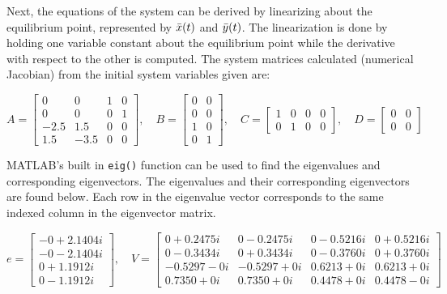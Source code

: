 \documentclass[../notes.tex]{subfiles}
\begin{document}
Next, the equations of the system can be derived by linearizing about the equilibrium point, represented by $\Bar{x}(t)$ and $\Bar{y}(t)$. The linearization is done by holding one variable constant about the equilibrium point while the derivative with respect to the other is computed. The system matrices calculated (numerical Jacobian) from the initial system variables given are:

\begin{equation*} 
  A =
  \begin{bmatrix}
    0 &0 &1 &0\\ 
    0 &0 &0 &1\\
    -2.5 &1.5 &0 &0\\
    1.5 &-3.5 &0 &0
  \end{bmatrix},
\quad
  B =
    \begin{bmatrix}
        0 &0 \\ 
        0 &0 \\
        1 &0 \\
        0 &1
    \end{bmatrix},
\quad
  C =
  \begin{bmatrix}
  1 &0 &0 &0 \\
  0 &1 &0 &0
  \end{bmatrix},
  \quad
  D =
  \begin{bmatrix}
  0 &0\\ 
  0 &0
  \end{bmatrix}
\end{equation*}

MATLAB's built in \verb|eig()| function can be used to find the eigenvalues and corresponding eigenvectors. The eigenvalues and their corresponding eigenvectors are found below. Each row in the eigenvalue vector corresponds to the same indexed column in the eigenvector matrix.

\begin{equation*}
    e = 
    \begin{bmatrix}
        -0 + 2.1404i \\
        -0 - 2.1404i \\ 
         0 + 1.1912i \\
         0 - 1.1912i
    \end{bmatrix},
    \quad
    V = 
    \begin{bmatrix}
        0 + 0.2475i  &0 - 0.2475i   &0 - 0.5216i   &0 + 0.5216i \\
        0 - 0.3434i  &0 + 0.3434i   &0 - 0.3760i   &0 + 0.3760i \\ 
        -0.5297 - 0i  &-0.5297 + 0i   &0.6213 + 0i   &0.6213 + 0i \\ 
         0.7350 + 0i  & 0.7350 + 0i   &0.4478 + 0i   &0.4478 - 0i
    \end{bmatrix}
\end{equation*}
\end{document}
